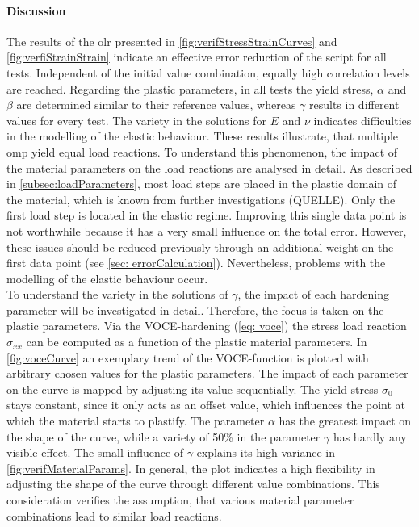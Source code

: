 \paragraph{Discussion}
The results of the \acrlong{olr} presented in \autoref{fig:verifStressStrainCurves} and \autoref{fig:verfiStrainStrain} indicate an effective error reduction of the script for all tests. Independent of the initial value combination, equally high correlation levels are reached. Regarding the plastic parameters, in all tests the yield stress, $\alpha$ and $\beta$ are determined similar to their reference values, whereas $\gamma$ results in different values for every test.  
The variety in the solutions for $E$ and $\nu$ indicates difficulties in the modelling of the elastic behaviour. 
These results illustrate, that multiple \acrlong{omp} yield equal load reactions. To understand this phenomenon, the impact of the material parameters on the load reactions are analysed in detail.
As described in \autoref{subsec:loadParameters}, most load steps are placed in the plastic domain of the material, which is known from further investigations (QUELLE).
Only the first load step is located in the elastic regime.
Improving this single data point is not worthwhile because it has a very small influence on the total error.
However, these issues should be reduced previously through an additional weight on the first data point (see \autoref{sec: errorCalculation}).
Nevertheless, problems with the modelling of the elastic behaviour occur. \\
\indent To understand the variety in the solutions of $\gamma$, the impact of each hardening parameter will be investigated in detail.
Therefore, the focus is taken on the plastic parameters. Via the VOCE-hardening (\autoref{eq: voce}) the stress load reaction $\sigma_{xx}$ can be computed as a function of the plastic material parameters.
In \autoref{fig:voceCurve} an exemplary trend of the VOCE-function is plotted with arbitrary chosen values for the plastic parameters. The impact of each parameter on the curve is mapped by adjusting its value sequentially. The yield stress $\sigma_0$ stays constant, since it only acts as an offset value, which influences the point at which the material starts to plastify. The parameter $\alpha$ has the greatest impact on the shape of the curve, while a variety of 50\% in the parameter $\gamma$ has hardly any visible effect. The small influence of $\gamma$ explains its high variance in \autoref{fig:verifMaterialParams}. In general, the plot indicates a high flexibility in adjusting the shape of the curve through different value combinations. This consideration verifies the assumption, that various material parameter combinations lead to similar load reactions.

